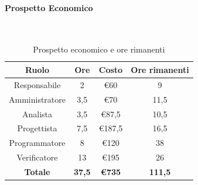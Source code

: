 \documentclass{article}
\begin{document}
                \paragraph{Prospetto Economico}\mbox{}\\
                \begin{table}[H]
                    \centering
                    \begin{tabular}{|c|c|c|c|}
                    \hline
                    \textbf{Ruolo}  & \textbf{Ore}  & \textbf{Costo} & \textbf{Ore rimanenti} \\ \hline
                    Responsabile    & 2             & €60            & 9                     \\ \hline
                    Amministratore  & 3,5           & €70            & 11,5                     \\ \hline
                    Analista        & 3,5           & €87,5          & 10,5                     \\ \hline
                    Progettista     & 7,5           & €187,5         & 16,5                     \\ \hline
                    Programmatore   & 8            & €120           & 38                     \\ \hline
                    Verificatore    & 13            & €195           & 26                     \\ \hline
                    \textbf{Totale} & \textbf{37,5} & \textbf{\euro735}   & \textbf{111,5}           \\ \hline
                    \end{tabular}
                    \caption{Prospetto economico e ore rimanenti}
                \end{table}
\end{document}
